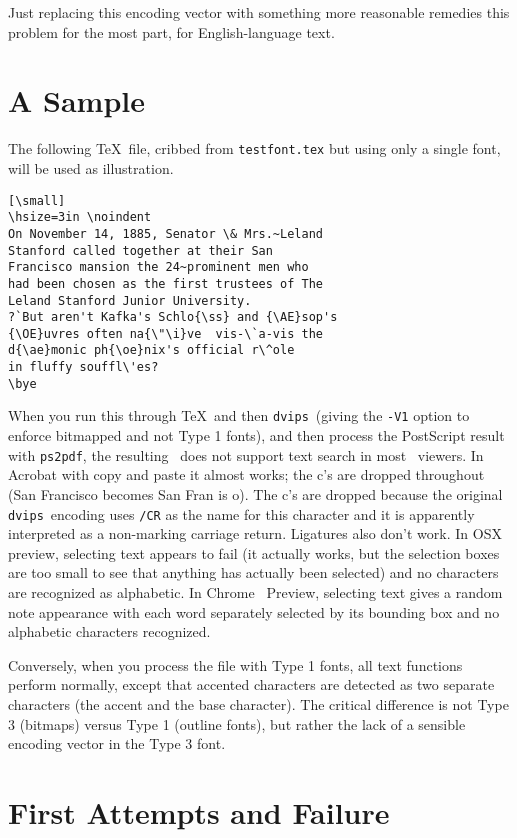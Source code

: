 \documentclass{ltugboat}
\def\PDF{\acro{PDF}}
\def\dvips{\texttt{dvips}}
\def\ps2pdf{\texttt{ps2pdf}}
\begin{document}
Just replacing this encoding vector with something more
reasonable remedies this problem for the most part, for
English-language text.

\section{A Sample}

The following \TeX\ file, cribbed from \texttt{testfont.tex}
but using only a single font, will be used as illustration.

\begin{verbatim}[\small]
\hsize=3in \noindent
On November 14, 1885, Senator \& Mrs.~Leland
Stanford called together at their San
Francisco mansion the 24~prominent men who
had been chosen as the first trustees of The
Leland Stanford Junior University.
?`But aren't Kafka's Schlo{\ss} and {\AE}sop's
{\OE}uvres often na{\"\i}ve  vis-\`a-vis the
d{\ae}monic ph{\oe}nix's official r\^ole
in fluffy souffl\'es?
\bye
\end{verbatim}
\noindent
When you run this through \TeX\ and then \dvips\
(giving the \texttt{-V1} option to enforce bitmapped
and not Type 1 fonts), and then process the PostScript
result with \ps2pdf, the resulting \PDF\ does not
support text search in most \PDF\ viewers.  In Acrobat
with copy and paste it almost works;
the c's are dropped throughout (San Francisco becomes
San Fran is o).  The c's are dropped because the
original \dvips\ encoding uses \texttt{/CR} as the
name for this character and it is apparently
interpreted as a non-marking carriage return.
Ligatures also don't work.  In OSX
preview, selecting text appears to fail (it
actually works, but the selection boxes are too small
to see that anything has actually been selected) and
no characters are recognized as alphabetic.  In Chrome
\PDF\ Preview, selecting text gives a random note
appearance with each word separately selected by its
bounding box and no alphabetic characters recognized.

Conversely, when you process the file with Type 1
fonts, all text functions perform normally, except that
accented characters are detected as two separate
characters (the accent and the base character).  The
critical difference is not Type 3 (bitmaps) versus
Type 1 (outline fonts), but rather the lack of a
sensible encoding vector in the Type 3 font.

\section{First Attempts and Failure}
\end{document}

